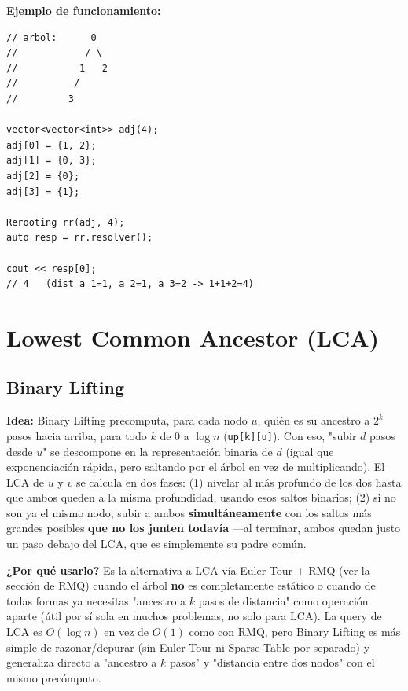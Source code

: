 \documentclass[10pt,a4paper,twocolumn]{article}
\begin{document}
\textbf{Ejemplo de funcionamiento:}

\begin{lstlisting}[style=cpp]
// arbol:      0
//            / \
//           1   2
//          /
//         3

vector<vector<int>> adj(4);
adj[0] = {1, 2};
adj[1] = {0, 3};
adj[2] = {0};
adj[3] = {1};

Rerooting rr(adj, 4);
auto resp = rr.resolver();

cout << resp[0];
// 4   (dist a 1=1, a 2=1, a 3=2 -> 1+1+2=4)
\end{lstlisting}



\section{Lowest Common Ancestor (LCA)}
\subsection{Binary Lifting}

\textbf{Idea:} Binary Lifting precomputa, para cada nodo $u$, quién
es su ancestro a $2^k$ pasos hacia arriba, para todo $k$ de $0$ a
$\log n$ (\texttt{up[k][u]}). Con eso, "subir $d$ pasos desde $u$" se
descompone en la representación binaria de $d$ (igual que
exponenciación rápida, pero saltando por el árbol en vez de
multiplicando). El LCA de $u$ y $v$ se calcula en dos fases: (1)
nivelar al más profundo de los dos hasta que ambos queden a la misma
profundidad, usando esos saltos binarios; (2) si no son ya el mismo
nodo, subir a ambos \textbf{simultáneamente} con los saltos más
grandes posibles \textbf{que no los junten todavía} —al terminar,
ambos quedan justo un paso debajo del LCA, que es simplemente su
padre común.

\textbf{¿Por qué usarlo?} Es la alternativa a LCA vía Euler Tour +
RMQ (ver la sección de RMQ) cuando el árbol \textbf{no} es
completamente estático o cuando de todas formas ya necesitas
"ancestro a $k$ pasos de distancia" como operación aparte (útil por
sí sola en muchos problemas, no solo para LCA). La query de LCA es
$O(\log n)$ en vez de $O(1)$ como con RMQ, pero Binary Lifting es más
simple de razonar/depurar (sin Euler Tour ni Sparse Table por
separado) y generaliza directo a "ancestro a $k$ pasos" y "distancia
entre dos nodos" con el mismo precómputo.
\end{document}
